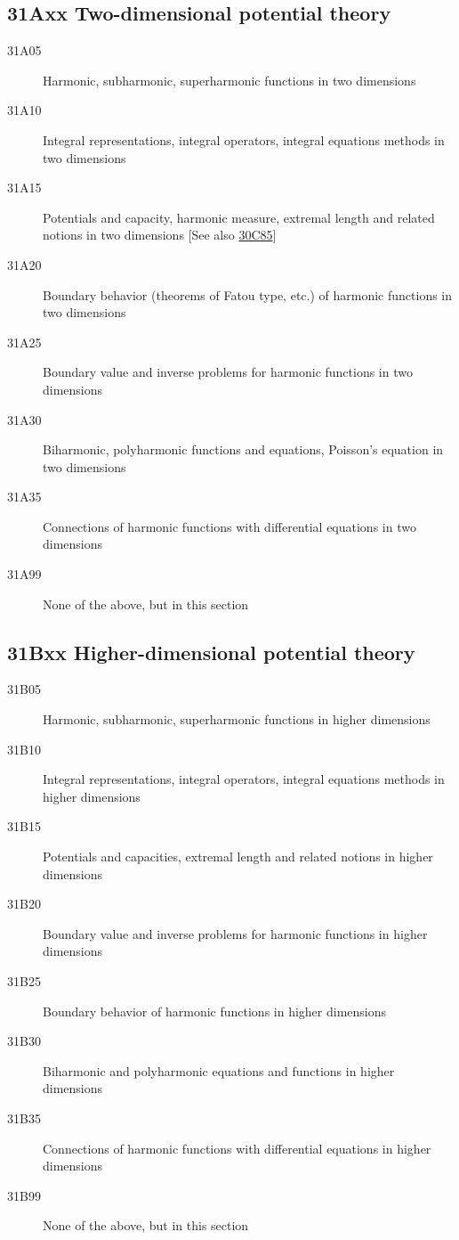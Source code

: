 \subsection*{31Axx  Two-dimensional potential theory }\label{31Axx}
\begin{description}  
\item [31A05]\label{31A05} Harmonic, subharmonic, superharmonic functions in two dimensions
\item [31A10]\label{31A10} Integral representations, integral operators, integral equations methods in two dimensions
\item [31A15]\label{31A15} Potentials and capacity, harmonic measure, extremal length and related notions in two dimensions [See also \hyperref[30C85]{30C85}]
\item [31A20]\label{31A20} Boundary behavior (theorems of Fatou type, etc.) of harmonic functions in two dimensions
\item [31A25]\label{31A25} Boundary value and inverse problems for harmonic functions in two dimensions
\item [31A30]\label{31A30} Biharmonic, polyharmonic functions and equations, Poisson's equation in two dimensions
\item [31A35]\label{31A35} Connections of harmonic functions with differential equations in two dimensions
\item [31A99]\label{31A99} None of the above, but in this section
\end{description}
\subsection*{31Bxx  Higher-dimensional potential theory }\label{31Bxx}
\begin{description}  
\item [31B05]\label{31B05} Harmonic, subharmonic, superharmonic functions in higher dimensions
\item [31B10]\label{31B10} Integral representations, integral operators, integral equations methods in higher dimensions
\item [31B15]\label{31B15} Potentials and capacities, extremal length and related notions in higher dimensions
\item [31B20]\label{31B20} Boundary value and inverse problems for harmonic functions in higher dimensions
\item [31B25]\label{31B25} Boundary behavior of harmonic functions in higher dimensions
\item [31B30]\label{31B30} Biharmonic and polyharmonic equations and functions in higher dimensions
\item [31B35]\label{31B35} Connections of harmonic functions with differential equations in higher dimensions
\item [31B99]\label{31B99} None of the above, but in this section 
\end{description}
